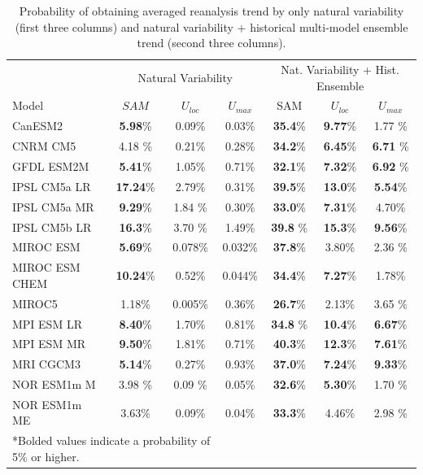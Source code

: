 {\small
\begin{table}
\caption{Probability of obtaining averaged reanalysis trend by only natural variability (first three columns) and natural variability + historical multi-model ensemble trend (second three columns). }
\centering
\begin{tabular}{p{4cm}cccccc}
\hline
  & \multicolumn{3}{c}{\footnotesize{Natural Variability}} & \multicolumn{3}{c}{\footnotesize{Nat. Variability + Hist. Ensemble}} \\
\cline{2-4}
\cline{5-7}

 Model  & $SAM$ &  $U_{loc}$ & $U_{max}$ & SAM & $U_{loc}$ &  $U_{max}$\\
\hline
 CanESM2   & \textbf{5.98}\% & 0.09\% & 0.03\% & \textbf{35.4}\% & \textbf{9.77}\% & 1.77 \%\\
 CNRM CM5 & 4.18 \% & 0.21\% & 0.28\% & \textbf{34.2}\% & \textbf{6.45}\% & \textbf{6.71} \%\\
  GFDL ESM2M & \textbf{5.41}\% & 1.05\% & 0.71\% & \textbf{32.1}\% & \textbf{7.32}\% & \textbf{6.92} \%\\
 IPSL CM5a LR & \textbf{17.24}\% & 2.79\% & 0.31\% & \textbf{39.5}\% & \textbf{13.0}\% & \textbf{5.54}\%\\
 IPSL CM5a MR & \textbf{9.29}\% & 1.84 \% & 0.30\% & \textbf{33.0}\% & \textbf{7.31}\% & 4.70\%\\
 IPSL CM5b LR & \textbf{16.3}\% & 3.70 \% & 1.49\% & \textbf{39.8} \% & \textbf{15.3}\% & \textbf{9.56}\%\\
 MIROC ESM & \textbf{5.69}\% & 0.078\% & 0.032\% & \textbf{37.8}\% & 3.80\% & 2.36 \%\\
 MIROC ESM CHEM & \textbf{10.24}\% & 0.52\% & 0.044\% & \textbf{34.4}\% & \textbf{7.27}\% & 1.78\%\\
 MIROC5 & 1.18\% & 0.005\% & 0.36\% & \textbf{26.7}\% & 2.13\% & 3.65 \%\\
 MPI ESM LR & \textbf{8.40}\% & 1.70\% & 0.81\% &  \textbf{34.8} \% & \textbf{10.4}\% & \textbf{6.67}\%\\
 MPI ESM MR & \textbf{9.50}\% & 1.81\% & 0.71\% & \textbf{40.3}\% & \textbf{12.3}\% & \textbf{7.61}\%\\
 MRI CGCM3 & \textbf{5.14}\% & 0.27\% & 0.93\% & \textbf{37.0}\% & \textbf{7.24}\% & \textbf{9.33}\%\\
 NOR ESM1m M & 3.98 \% & 0.09 \% & 0.05\% & \textbf{32.6}\% & \textbf{5.30}\% & 1.70 \%\\
 NOR ESM1m ME & 3.63\% & 0.09\% & 0.04\% & \textbf{33.3}\% & 4.46\% & 2.98 \%\\
\hline
\multicolumn{3}{l}{\footnotesize{*Bolded values indicate a probability of 5\% or higher.}}
\end{tabular}
\end{table}
}

